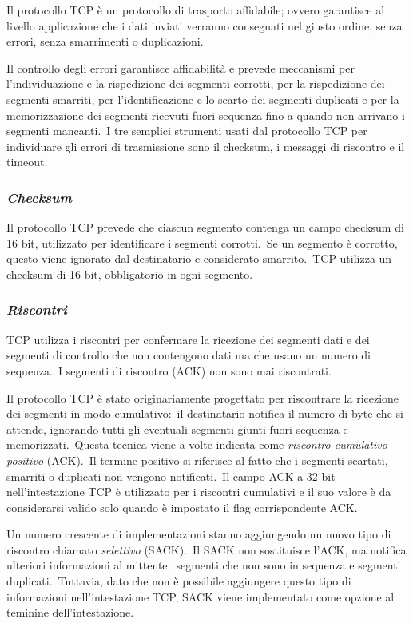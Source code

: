 Il protocollo TCP è un protocollo di trasporto affidabile; ovvero garantisce al livello applicazione che i dati inviati verranno consegnati nel giusto ordine, senza errori, senza smarrimenti o duplicazioni.

Il controllo degli errori garantisce affidabilità e prevede meccanismi per l'individuazione e la rispedizione dei segmenti corrotti, per la rispedizione dei segmenti smarriti, per l'identificazione e lo scarto dei segmenti duplicati e per la memorizzazione dei segmenti ricevuti fuori sequenza fino a quando non arrivano i segmenti mancanti.\
I tre semplici strumenti usati dal protocollo TCP per individuare gli errori di trasmissione sono il checksum, i messaggi di riscontro e il timeout.

\subsubsection{\emph{Checksum}}

Il protocollo TCP prevede che ciascun segmento contenga un campo checksum di 16 bit, utilizzato per identificare i segmenti corrotti.\
Se un segmento è corrotto, questo viene ignorato dal destinatario e considerato smarrito.\
TCP utilizza un checksum di 16 bit, obbligatorio in ogni segmento.

\subsubsection{\emph{Riscontri}}

TCP utilizza i riscontri per confermare la ricezione dei segmenti dati e dei segmenti di controllo che non contengono dati ma che usano un numero di sequenza.\
I segmenti di riscontro (ACK) non sono mai riscontrati.

Il protocollo TCP è stato originariamente progettato per riscontrare la ricezione dei segmenti in modo cumulativo:\ il destinatario notifica il numero di byte che si attende, ignorando tutti gli eventuali segmenti giunti fuori sequenza e memorizzati.\
Questa tecnica viene a volte indicata come \emph{riscontro cumulativo positivo} (ACK).\
Il termine positivo si riferisce al fatto che i segmenti scartati, smarriti o duplicati non vengono notificati.\
Il campo ACK a 32 bit nell'intestazione TCP è utilizzato per i riscontri cumulativi e il suo valore è da considerarsi valido solo quando è impostato il flag corrispondente ACK.

Un numero crescente di implementazioni stanno aggiungendo un nuovo tipo di riscontro chiamato \emph{selettivo} (SACK).\
Il SACK non sostituisce l'ACK, ma notifica ulteriori informazioni al mittente:\ segmenti che non sono in sequenza e segmenti duplicati.\
Tuttavia, dato che non è possibile aggiungere questo tipo di informazioni nell'intestazione TCP, SACK viene implementato come opzione al teminine dell'intestazione.

